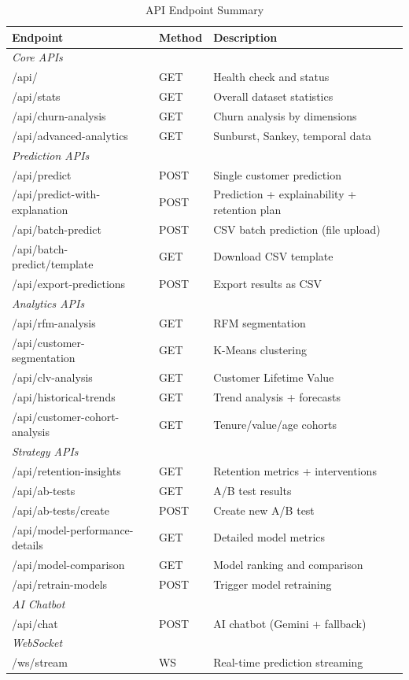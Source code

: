 \documentclass[12pt, a4paper]{report}
\begin{document}
\begin{table}[H]
\centering
\caption{API Endpoint Summary}
\label{tab:endpoints}
\footnotesize
\begin{tabularx}{\textwidth}{l l X}
\toprule
\textbf{Endpoint} & \textbf{Method} & \textbf{Description} \\
\midrule
\multicolumn{3}{l}{\textit{Core APIs}} \\
/api/ & GET & Health check and status \\
/api/stats & GET & Overall dataset statistics \\
/api/churn-analysis & GET & Churn analysis by dimensions \\
/api/advanced-analytics & GET & Sunburst, Sankey, temporal data \\
\midrule
\multicolumn{3}{l}{\textit{Prediction APIs}} \\
/api/predict & POST & Single customer prediction \\
/api/predict-with-explanation & POST & Prediction + explainability + retention plan \\
/api/batch-predict & POST & CSV batch prediction (file upload) \\
/api/batch-predict/template & GET & Download CSV template \\
/api/export-predictions & POST & Export results as CSV \\
\midrule
\multicolumn{3}{l}{\textit{Analytics APIs}} \\
/api/rfm-analysis & GET & RFM segmentation \\
/api/customer-segmentation & GET & K-Means clustering \\
/api/clv-analysis & GET & Customer Lifetime Value \\
/api/historical-trends & GET & Trend analysis + forecasts \\
/api/customer-cohort-analysis & GET & Tenure/value/age cohorts \\
\midrule
\multicolumn{3}{l}{\textit{Strategy APIs}} \\
/api/retention-insights & GET & Retention metrics + interventions \\
/api/ab-tests & GET & A/B test results \\
/api/ab-tests/create & POST & Create new A/B test \\
/api/model-performance-details & GET & Detailed model metrics \\
/api/model-comparison & GET & Model ranking and comparison \\
/api/retrain-models & POST & Trigger model retraining \\
\midrule
\multicolumn{3}{l}{\textit{AI Chatbot}} \\
/api/chat & POST & AI chatbot (Gemini + fallback) \\
\midrule
\multicolumn{3}{l}{\textit{WebSocket}} \\
/ws/stream & WS & Real-time prediction streaming \\
\bottomrule
\end{tabularx}
\end{table}
\end{document}
